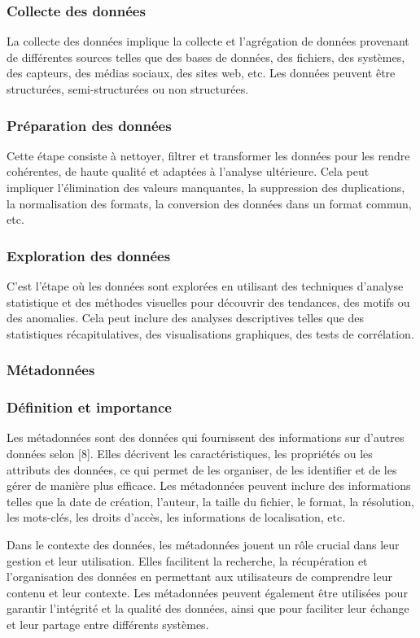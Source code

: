 \documentclass{article}
\begin{document}
	\subsubsection{Collecte des données}
	La collecte des données implique la collecte et l’agrégation de données provenant de différentes sources telles que des bases de données, des fichiers, des systèmes, des capteurs, des médias sociaux, des sites web, etc. Les données peuvent être structurées, semi-structurées ou non structurées.
	
	\subsubsection{Préparation des données}
	Cette étape consiste à nettoyer, filtrer et transformer les données pour les rendre cohérentes, de haute qualité et adaptées à l’analyse ultérieure. Cela peut impliquer l’élimination des valeurs manquantes, la suppression des duplications, la normalisation des formats, la conversion des données dans un format commun, etc.
	
	\subsubsection{Exploration des données}
	C’est l’étape où les données sont explorées en utilisant des techniques d’analyse statistique et des méthodes visuelles pour découvrir des tendances, des motifs ou des anomalies. Cela peut inclure des analyses descriptives telles que des statistiques récapitulatives, des visualisations graphiques, des tests de corrélation.
	
	\subsubsection{Métadonnées}
	\subsubsection{Définition et importance}
	Les métadonnées sont des données qui fournissent des informations sur d’autres données selon [8]. Elles décrivent les caractéristiques, les propriétés ou les attributs des données, ce qui permet de les organiser, de les identifier et de les gérer de manière plus efficace. Les métadonnées peuvent inclure des informations telles que la date de création, l’auteur, la taille du fichier, le format, la résolution, les mots-clés, les droits d’accès, les informations de localisation, etc.
	
	Dans le contexte des données, les métadonnées jouent un rôle crucial dans leur gestion et leur utilisation. Elles facilitent la recherche, la récupération et l’organisation des données en permettant aux utilisateurs de comprendre leur contenu et leur contexte. Les métadonnées peuvent également être utilisées pour garantir l’intégrité et la qualité des données, ainsi que pour faciliter leur échange et leur partage entre différents systèmes.
	
\end{document}
